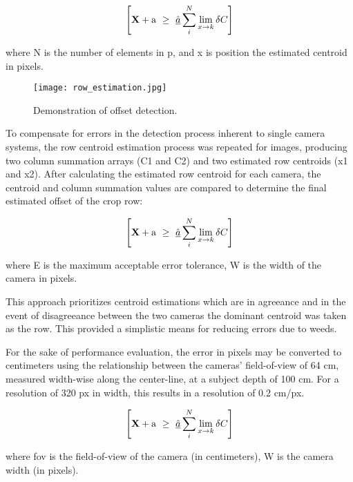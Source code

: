 \begin{equation}
  \left[
    {\bf X} + {\rm a} \ \geq\ 
    \underline{\hat a} \sum_i^N \lim_{x \rightarrow k} \delta C
  \right]
  \label{eq:centroid}
\end{equation}
\begin{flushleft}
where N is the number of elements in p, and x is position the estimated centroid in pixels.
\begin{flushleft}

\begin{figure}
  \centering
  \texttt{[image: row\_estimation.jpg]}
  \caption{Demonstration of offset detection.}
  \label{fig:row_estimation}
\end{figure}

To compensate for errors in the detection process inherent to single
camera systems, the row centroid estimation process was repeated for
images, producing two column summation arrays (C1 and C2) and two
estimated row centroids (x1 and x2). After calculating the estimated
row centroid for each camera, the centroid and column summation values
are compared to determine the final estimated offset of the crop row:

\begin{equation}
  \left[
    {\bf X} + {\rm a} \ \geq\ 
    \underline{\hat a} \sum_i^N \lim_{x \rightarrow k} \delta C
  \right]
  \label{eq:camera_selection}
\end{equation}
\begin{flushleft}
where E is the maximum acceptable error tolerance, W is the width of
the camera in pixels. 
\end{flushleft}

This approach prioritizes centroid estimations which are in agreeance
and in the event of disagreeance between the two cameras the dominant
centroid was taken as the row. This provided a simplistic means for
reducing errors due to weeds.

For the sake of performance evaluation, the error in pixels may be
converted to centimeters using the relationship between the cameras’
field-of-view of 64 cm, measured width-wise along the center-line, at
a subject depth of 100 cm. For a resolution of 320 px in width, this
results in a resolution of 0.2 cm/px.

\begin{equation}
  \left[
    {\bf X} + {\rm a} \ \geq\ 
    \underline{\hat a} \sum_i^N \lim_{x \rightarrow k} \delta C
  \right]
  \label{eq:px2mm}
\end{equation}
\begin{flushleft}
where fov is the field-of-view of the camera (in centimeters), W is
the camera width (in pixels).
\end{flushleft}


\end{flushleft}
\end{flushleft}
